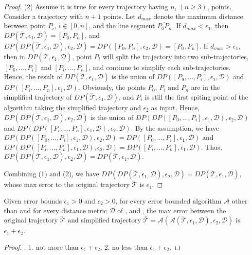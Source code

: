 \begin{proof}
	(2) Assume it is true for every trajectory  having $n$, $(n \ge 3)$, points.
	Consider a trajectory with $n+1$ points. Let $d_{max}$ denote the maximum distance between point $P_i$, $i \in [0,n]$, and the line segment $\overline{P_0P_{n}}$. 
	If $d_{max}<\epsilon_1$, then $DP(\dddot{\mathcal{T}}, \epsilon_1, \mathcal{D})=[P_0, P_{n}]$, and $DP(DP(\dddot{\mathcal{T}}, \epsilon_1, \mathcal{D}), \epsilon_2, \mathcal{D}) = DP([P_0, P_{n}], \epsilon_2, \mathcal{D})=[P_0, P_{n}]$.
	If $d_{max} > \epsilon_1$, then in $DP(\dddot{\mathcal{T}}, \epsilon_1, \mathcal{D})$, point $P_i$ will split the trajectory  into two sub-trajectories, \ie $[P_0, ..., P_i]$ and $[P_{i}, ..., P_{n}]$, and continue to simplify each sub-trajectories. Hence, the result of $DP(\dddot{\mathcal{T}}, \epsilon_1, \mathcal{D})$ is the union of $DP([P_0, ..., P_i], \epsilon_1, \mathcal{D})$ and $DP([P_i, ..., P_n], \epsilon_1, \mathcal{D})$.
	Obviously, the points $P_0$, $P_i$ and $P_n$ are in the simplified trajectory of $DP(\dddot{\mathcal{T}}, \epsilon_1, \mathcal{D})$, and $P_i$ is still the first spiting point of the \dpa algorithm taking the simplified trajectory and $\epsilon_2$ as input. Hence, $DP(DP(\dddot{\mathcal{T}}, \epsilon_1, \mathcal{D}), \epsilon_2, \mathcal{D})$ is the union of $DP(DP([P_0, ..., P_i], \epsilon_1, \mathcal{D}), \epsilon_2, \mathcal{D})$ and $DP(DP([P_i, ..., P_n], \epsilon_1, \mathcal{D}), \epsilon_2, \mathcal{D})$. By the assumption, we have $DP(DP([P_0, ..., P_i], \epsilon_1, \mathcal{D}), \epsilon_2, \mathcal{D}) = DP([P_0, ..., P_i], \epsilon_1, \mathcal{D})$ and $DP(DP([P_i, ..., P_n], \epsilon_1, \mathcal{D}), \epsilon_2, \mathcal{D}) = DP([P_i, ..., P_n], \epsilon_1, \mathcal{D})$. Thus, $DP(DP(\dddot{\mathcal{T}}, \epsilon_1, \mathcal{D}), \epsilon_2, \mathcal{D}) = DP(\dddot{\mathcal{T}}, \epsilon_1, \mathcal{D})$.
	
	Combining (1) and (2), we have $DP(DP(\dddot{\mathcal{T}}, \epsilon_1, \mathcal{D}), \epsilon_2, \mathcal{D}) = DP(\dddot{\mathcal{T}}, \epsilon_1, \mathcal{D})$, whose max error to the original trajectory $\dddot{\mathcal{T}}$ is $\epsilon_1$.

\end{proof}




\begin{theorem}
	\label{theo-aging-distance}
	Given error bounds $\epsilon_1>0$ and $\epsilon_2>0$, for every error bounded \lsa algorithm $\mathcal{A}$ other than \dpa and for every distance metric $\mathcal{D}$ of \ped, \sed and \dad, the max error between the original trajectory $\dddot{\mathcal{T}}$ and simplified trajectory $\overline{\mathcal{T}}=\mathcal{A}(\mathcal{A}(\dddot{\mathcal{T}}, \epsilon_1, \mathcal{D}), \epsilon_2, \mathcal{D})$ is $\epsilon_1+ \epsilon_2$.
\end{theorem}

\begin{proof}
	\todo.
	1. not more than $\epsilon_1+ \epsilon_2$.
	2. no less than $\epsilon_1+ \epsilon_2$.
	
\end{proof}